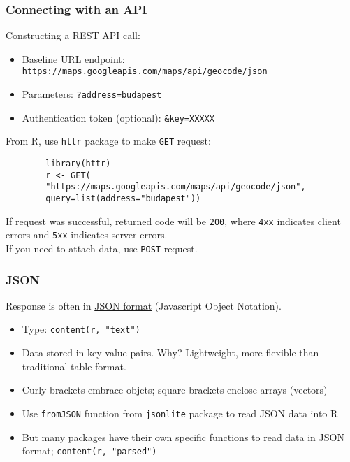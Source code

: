 \documentclass{beamer}
\begin{document}
\begin{frame}[fragile]
	\frametitle{Connecting with an API}
	
	Constructing a REST API call:
	\vspace{.20cm}
	\begin{itemize}
		\item Baseline URL \alert{endpoint}: \scriptsize{\texttt{https://maps.googleapis.com/maps/api/geocode/json}}
		\item Parameters: \texttt{?address=budapest}
		\item Authentication token (optional): \texttt{\&key=XXXXX}
	\end{itemize}
	\vspace{.20cm}
	From R, use \texttt{httr} package to make \texttt{GET} request:\\
	\vspace{.10cm}
	\begin{small}
		\begin{verbatim}
		library(httr)
		r <- GET(
		"https://maps.googleapis.com/maps/api/geocode/json",
		query=list(address="budapest"))
		\end{verbatim}
	\end{small}
	If request was successful, returned code will be \texttt{200}, where \texttt{4xx} indicates client errors and \texttt{5xx} indicates server errors.\\
	If you need to attach data, use \texttt{POST} request.
	
\end{frame}


\begin{frame}[fragile]
	\frametitle{JSON}
	Response is often in \href{https://maps.googleapis.com/maps/api/geocode/json?address=budapest}{JSON format} (Javascript Object Notation). \\ \pause
	\begin{itemize}[<+->]
		\item Type: \verb|content(r, "text")|
		\item Data stored in key-value pairs. Why? Lightweight, more flexible than traditional table format.
		\item Curly brackets embrace objets; square brackets enclose arrays (vectors)
		\item Use \texttt{fromJSON} function from \texttt{jsonlite} package to read JSON data into R
		\item But many packages have their own specific functions to read data in JSON format; \verb|content(r, "parsed")|
	\end{itemize}
	
	
	
\end{frame}
\end{document}
